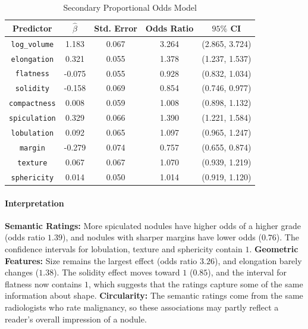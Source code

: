 \documentclass[12pt]{article}
\begin{document}
\begin{table}[H]
  \centering
  \begin{tabular}{|| c | c | c | c | c ||}
    \hline
    \textbf{Predictor}
    & $\hat{\beta}$
    & \textbf{Std. Error}
    & \textbf{Odds Ratio}
    & \textbf{$95\%$ CI} \\[0.5ex]
    \hline\hline
    \texttt{log\_volume} & 1.183 & 0.067 & 3.264 & (2.865, 3.724) \\
    \texttt{elongation} & 0.321 & 0.055 & 1.378 & (1.237, 1.537) \\
    \texttt{flatness} & -0.075 & 0.055 & 0.928 & (0.832, 1.034) \\
    \texttt{solidity} & -0.158 & 0.069 & 0.854 & (0.746, 0.977) \\
    \texttt{compactness} & 0.008 & 0.059 & 1.008 & (0.898, 1.132) \\
    \texttt{spiculation} & 0.329 & 0.066 & 1.390 & (1.221, 1.584) \\
    \texttt{lobulation} & 0.092 & 0.065 & 1.097 & (0.965, 1.247) \\
    \texttt{margin} & -0.279 & 0.074 & 0.757 & (0.655, 0.874) \\
    \texttt{texture} & 0.067 & 0.067 & 1.070 & (0.939, 1.219) \\
    \texttt{sphericity} & 0.014 & 0.050 & 1.014 & (0.919, 1.120) \\
    \hline
  \end{tabular}
  \caption{Secondary Proportional Odds Model}
  \label{table:polr_secondary}
\end{table}

\paragraph{Interpretation}
\begin{itemize}
    \ii \textbf{Semantic Ratings:} More spiculated nodules have higher
    odds of a higher grade (odds ratio $1.39$), and nodules with
    sharper margins have lower odds ($0.76$). The confidence intervals
    for lobulation, texture and sphericity contain $1$.
    \ii \textbf{Geometric Features:} Size remains the largest effect
    (odds ratio $3.26$), and elongation barely changes ($1.38$). The
    solidity effect moves toward $1$ ($0.85$), and the interval for
    flatness now contains $1$, which suggests that the ratings capture
    some of the same information about shape.
    \ii \textbf{Circularity:} The semantic ratings come from the same
    radiologists who rate malignancy, so these associations may partly
    reflect a reader's overall impression of a nodule.
\end{itemize}
\end{document}
